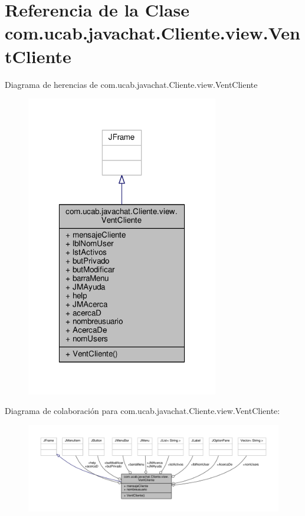 \hypertarget{classcom_1_1ucab_1_1javachat_1_1_cliente_1_1view_1_1_vent_cliente}{\section{Referencia de la Clase com.\-ucab.\-javachat.\-Cliente.\-view.\-Vent\-Cliente}
\label{classcom_1_1ucab_1_1javachat_1_1_cliente_1_1view_1_1_vent_cliente}
}


Diagrama de herencias de com.\-ucab.\-javachat.\-Cliente.\-view.\-Vent\-Cliente
\nopagebreak
\begin{figure}[H]
\begin{center}
\leavevmode
\includegraphics[width=238pt]{de/d8b/classcom_1_1ucab_1_1javachat_1_1_cliente_1_1view_1_1_vent_cliente__inherit__graph}
\end{center}
\end{figure}


Diagrama de colaboración para com.\-ucab.\-javachat.\-Cliente.\-view.\-Vent\-Cliente\-:
\nopagebreak
\begin{figure}[H]
\begin{center}
\leavevmode
\includegraphics[width=350pt]{d8/d5f/classcom_1_1ucab_1_1javachat_1_1_cliente_1_1view_1_1_vent_cliente__coll__graph}
\end{center}
\end{figure}
